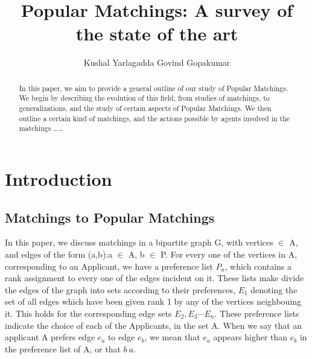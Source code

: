 \documentclass{llncs}
\begin{document}
\title{Popular Matchings: A survey of the state of the art}



\author{Kushal Yarlagadda  Govind Gopakumar}







\maketitle

\begin{abstract}
In this paper, we aim to provide a general outline of our study of Popular Matchings. We begin by describing the evolution of this field, from studies of matchings, to generalizations, and the study of certain aspects of Popular Matchings. We then outline a certain kind of matchings, and the actions possible by agents involved in the matchings \ldots\ldots
\end{abstract}

\section{Introduction}
\subsection{Matchings to Popular Matchings}

In this paper, we discuss  matchings in a bipartite graph G, with vertices $\in$ A\cupP, and edges of the form (a,b):\lbrace a $\in$ A, b $\in$ P\rbrace. For every one of the vertices in A, corresponding to an Applicant, we have a preference list $P_a$, which contains a rank assignment to every one of the edges incident on it. These lists make divide the edges of the graph into sets according to their preferences, $E_1$ denoting the set of all edges which have been given rank 1 by any of the vertices neighbouing it. This holds for the corresponding edge sets $E_2, E_3 \cdots E_n$. These preference lists indicate the choice of each of the Applicants, in the set A. When we say that an applicant A prefers edge $e_a$ to edge $e_b$, we mean that $e_a$ appears higher than $e_b$  in the preference list of A, or that $b \> a$.  
\end{document}
